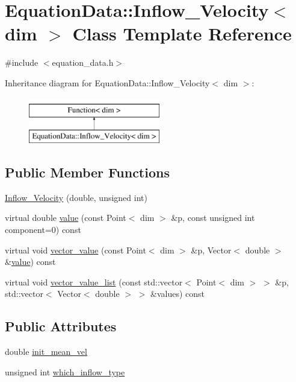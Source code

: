 \hypertarget{class_equation_data_1_1_inflow___velocity}{}\section{Equation\+Data\+:\+:Inflow\+\_\+\+Velocity$<$ dim $>$ Class Template Reference}
\label{class_equation_data_1_1_inflow___velocity}


{\ttfamily \#include $<$equation\+\_\+data.\+h$>$}

Inheritance diagram for Equation\+Data\+:\+:Inflow\+\_\+\+Velocity$<$ dim $>$\+:\begin{figure}[H]
\begin{center}
\leavevmode
\includegraphics[height=2.000000cm]{class_equation_data_1_1_inflow___velocity}
\end{center}
\end{figure}
\subsection*{Public Member Functions}
\begin{DoxyCompactItemize}
\item 
\hyperlink{class_equation_data_1_1_inflow___velocity_ac5035db1e557027579fd3b3c0220c671}{Inflow\+\_\+\+Velocity} (double, unsigned int)
\item 
virtual double \hyperlink{class_equation_data_1_1_inflow___velocity_a986662426fb6b3685ced24ce676a6ac4}{value} (const Point$<$ dim $>$ \&p, const unsigned int component=0) const 
\item 
virtual void \hyperlink{class_equation_data_1_1_inflow___velocity_aad33ff25f7b8e2260cb40311d0b15aa6}{vector\+\_\+value} (const Point$<$ dim $>$ \&p, Vector$<$ double $>$ \&\hyperlink{class_equation_data_1_1_inflow___velocity_a986662426fb6b3685ced24ce676a6ac4}{value}) const 
\item 
virtual void \hyperlink{class_equation_data_1_1_inflow___velocity_a777730a2849272dfa7b3acb5cd83106f}{vector\+\_\+value\+\_\+list} (const std\+::vector$<$ Point$<$ dim $>$ $>$ \&p, std\+::vector$<$ Vector$<$ double $>$ $>$ \&values) const 
\end{DoxyCompactItemize}
\subsection*{Public Attributes}
\begin{DoxyCompactItemize}
\item 
double \hyperlink{class_equation_data_1_1_inflow___velocity_a00fdc2d87172dbf05e274529d53e4874}{init\+\_\+mean\+\_\+vel}
\item 
unsigned int \hyperlink{class_equation_data_1_1_inflow___velocity_affb59b1d9b0d574a0aec58652b6dff88}{which\+\_\+inflow\+\_\+type}
\end{DoxyCompactItemize}


